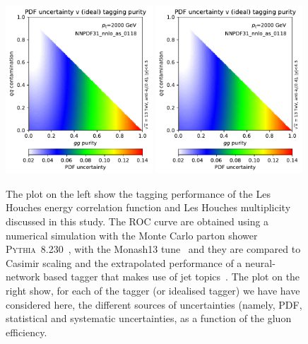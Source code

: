 \begin{figure}
\begin{center}
\includegraphics[width=0.49\textwidth, page=4]{figs/performance-plots.pdf} \hfill
\includegraphics[width=0.49\textwidth, page=5]{figs/performance-plots.pdf}
\caption{The plot on the left show the tagging performance of the Les Houches energy correlation function and Les Houches multiplicity discussed in this study. 
The ROC curve are obtained using a numerical simulation with the Monte Carlo parton shower \textsc{Pythia}~8.230~\cite{Sjostrand:2014zea}, with the Monash13 tune~\cite{Skands:2014pea} and they are compared to Casimir scaling and the extrapolated performance of a neural-network based tagger that makes use of jet topics~\cite{Metodiev:2018ftz,Komiske:2018vkc}.
The plot on the right show, for each of the tagger (or idealised tagger) we have have considered here, the different sources of uncertainties (namely, PDF, statistical and systematic uncertainties, as a function of the gluon efficiency. 
}
\label{fig:performance_studies} 
\end{center}
\end{figure}
